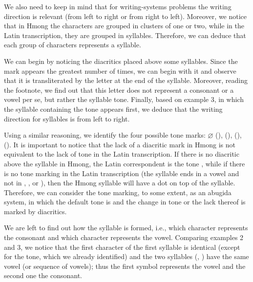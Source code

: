 \begin{refsection}
\begin{mysolution}

We also need to keep in mind that for writing-systems problems the writing direction is relevant (from left to right or from right to left). Moreover, we notice that in Hmong the characters are grouped in clusters of one or two, while in the Latin transcription, they are grouped in syllables. Therefore, we can deduce that each group of characters represents a syllable.

We can begin by noticing the diacritics placed above some syllables. Since the mark  appears the greatest number of times, we can begin with it and observe that it is transliterated by the letter  at the end of the syllable. Moreover, reading the footnote, we find out that this letter does not represent a consonant or a vowel per se, but rather the syllable tone. Finally, based on example 3, in which the syllable containing the  tone appears first, we deduce that the writing direction for syllables is from left to right.

Using a similar reasoning, we identify the four possible tone marks: $\varnothing$ (),  (),  (),  (). It is important to notice that the lack of a diacritic mark in Hmong is not equivalent to the lack of tone in the Latin transcription. If there is no diacritic above the syllable in Hmong, the Latin correspondent is the tone , while if there is no tone marking in the Latin transcription (the syllable ends in a vowel and not in , , or ), then the Hmong syllable will have a dot on top of the syllable. Therefore, we can consider the tone marking, to some extent, as an abugida system, in which the default tone is  and the change in tone or the lack thereof is marked by diacritics.

We are left to find out how the syllable is formed, i.e., which character represents the consonant and which character represents the vowel. Comparing examples 2 and 3, we notice that the first character of the first syllable is identical (except for the tone, which we already identified) and the two syllables (, ) have the same vowel (or sequence of vowels); thus the first symbol represents the vowel and the second one the consonant.


\end{mysolution}
\end{refsection}
